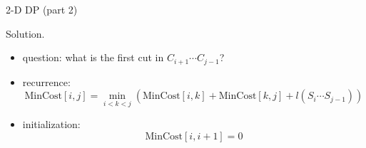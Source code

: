 \begin{frame}{2-D DP (part 2)}
  \begin{block}{Solution.}
    \begin{itemize}
      \item question: what is the first cut in $C_{i+1} \cdots C_{j-1}$?
      \item recurrence:
	\[
	  \text{MinCost}[i,j] = \min_{i < k < j} \left( \text{MinCost}[i,k] + \text{MinCost}[k,j] + l(S_{i} \cdots S_{j-1}) \right)
	\]
      \item initialization:
	\[
	  \text{MinCost}[i, i+1] = 0
	\]
    \end{itemize}
  \end{block}
\end{frame}
